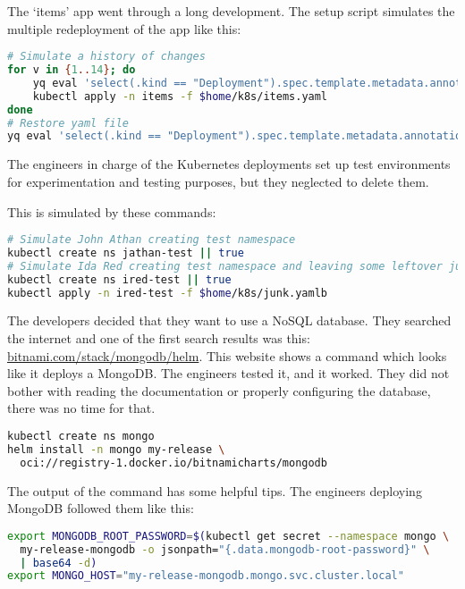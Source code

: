 The `items' app went through a long development. The setup script simulates the multiple redeployment of the app like this:

\begin{lstlisting}[caption={Create first deployment},language=bash,label=code:bash4]
# Simulate a history of changes
for v in {1..14}; do
    yq eval 'select(.kind == "Deployment").spec.template.metadata.annotations.v = env(v)' $home/k8s/items.yaml -i
    kubectl apply -n items -f $home/k8s/items.yaml
done
# Restore yaml file
yq eval 'select(.kind == "Deployment").spec.template.metadata.annotations.v = "0"' $home/k8s/items.yaml -i
\end{lstlisting}

The engineers in charge of the Kubernetes deployments set up test environments for experimentation and testing purposes, but they neglected to delete them.

This is simulated by these commands:

\begin{lstlisting}[caption={Create first deployment},language=bash,label=code:bash5]
# Simulate John Athan creating test namespace
kubectl create ns jathan-test || true
# Simulate Ida Red creating test namespace and leaving some leftover junk in it
kubectl create ns ired-test || true
kubectl apply -n ired-test -f $home/k8s/junk.yamlb     
\end{lstlisting}

The developers decided that they want to use a NoSQL database. They searched the internet and one of the first search results was this: \url{bitnami.com/stack/mongodb/helm}. This website shows a command which looks like it deploys a MongoDB. The engineers tested it, and it worked. They did not bother with reading the documentation or properly configuring the database, there was no time for that.

\begin{lstlisting}[caption={Create first deployment},language=bash,label=code:bash5]
kubectl create ns mongo
helm install -n mongo my-release \
  oci://registry-1.docker.io/bitnamicharts/mongodb
\end{lstlisting}

The output of the command has some helpful tips. The engineers deploying MongoDB followed them like this:

\begin{lstlisting}[caption={Create first deployment},language=bash,label=code:bash6]
export MONGODB_ROOT_PASSWORD=$(kubectl get secret --namespace mongo \
  my-release-mongodb -o jsonpath="{.data.mongodb-root-password}" \
  | base64 -d)
export MONGO_HOST="my-release-mongodb.mongo.svc.cluster.local"
\end{lstlisting}

